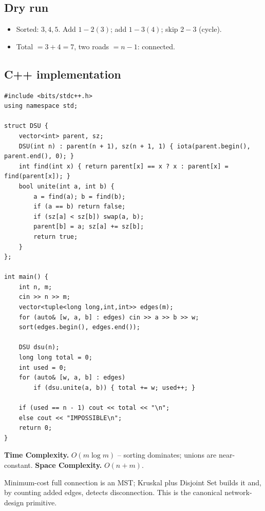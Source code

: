 \subsection*{Dry run}


\begin{itemize}
  \item Sorted: $3,4,5$. Add $1\!-\!2(3)$; add $1\!-\!3(4)$; skip
        $2\!-\!3$ (cycle).
  \item Total $=3+4=7$, two roads $=n-1$: connected.
\end{itemize}

\subsection*{C++ implementation}

\begin{lstlisting}
#include <bits/stdc++.h>
using namespace std;

struct DSU {
    vector<int> parent, sz;
    DSU(int n) : parent(n + 1), sz(n + 1, 1) { iota(parent.begin(), parent.end(), 0); }
    int find(int x) { return parent[x] == x ? x : parent[x] = find(parent[x]); }
    bool unite(int a, int b) {
        a = find(a); b = find(b);
        if (a == b) return false;
        if (sz[a] < sz[b]) swap(a, b);
        parent[b] = a; sz[a] += sz[b];
        return true;
    }
};

int main() {
    int n, m;
    cin >> n >> m;
    vector<tuple<long long,int,int>> edges(m);
    for (auto& [w, a, b] : edges) cin >> a >> b >> w;
    sort(edges.begin(), edges.end());

    DSU dsu(n);
    long long total = 0;
    int used = 0;
    for (auto& [w, a, b] : edges)
        if (dsu.unite(a, b)) { total += w; used++; }

    if (used == n - 1) cout << total << "\n";
    else cout << "IMPOSSIBLE\n";
    return 0;
}
\end{lstlisting}

\begin{complexitybox}
\textbf{Time Complexity.} $O(m\log m)$ -- sorting dominates; unions are
near-constant. \textbf{Space Complexity.} $O(n+m)$.
\end{complexitybox}

\begin{takeawaybox}
Minimum-cost full connection is an MST; Kruskal plus Disjoint Set builds it
and, by counting added edges, detects disconnection. This is the canonical
network-design primitive.
\end{takeawaybox}
